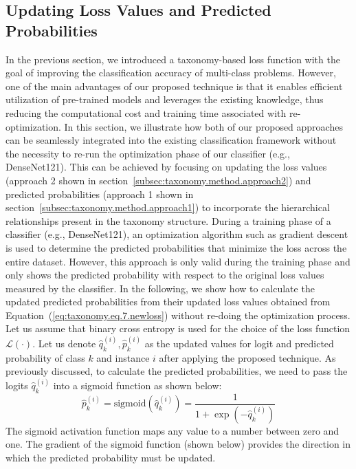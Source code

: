 \subsection{Updating Loss Values and Predicted Probabilities}\label{subsec:updating-loss-values-and-predicted-probabilities}
In the previous section, we introduced a taxonomy-based loss function with the goal of improving the classification accuracy of multi-class problems. However, one of the main advantages of our proposed technique is that it enables efficient utilization of pre-trained models and leverages the existing knowledge, thus reducing the computational cost and training time associated with re-optimization. In this section, we illustrate how both of our proposed approaches can be seamlessly integrated into the existing classification framework without the necessity to re-run the optimization phase of our classifier (e.g., DenseNet121). This can be achieved by focusing on updating the loss values (approach 2 shown in section~\ref{subsec:taxonomy.method.approach2}) and predicted probabilities (approach 1 shown in section~\ref{subsec:taxonomy.method.approach1}) to incorporate the hierarchical relationships present in the taxonomy structure.
During a training phase of a classifier (e.g., DenseNet121), an optimization algorithm such as gradient descent is used to determine the predicted probabilities that minimize the loss across the entire dataset. However, this approach is only valid during the training phase and only shows the predicted probability with respect to the original loss values measured by the classifier.
In the following, we show how to calculate the updated predicted probabilities from their updated loss values obtained from Equation~(\ref{eq:taxonomy.eq.7.newloss}) without re-doing the optimization process. Let us assume that binary cross entropy is used for the choice of the loss function $\mathcal{L}(\cdot) $. Let us denote $\widehat{q}_k^{(i)} , \widehat{p}_k^{(i)} $ as the updated values for logit and predicted probability of class $k $ and instance $i $ after applying the proposed technique. As previously discussed, to calculate the predicted probabilities, we need to pass the logits ${\widehat q}_k^{(i)} $ into a sigmoid function as shown below:
\begin{equation}
    \label{eq:taxonomy.eq.9.sigmoid}
    \widehat{p}_k^{(i)}=\text{sigmoid}\left(\widehat{q}_k^{(i)}\right)=\frac1{1+\exp\left(-\widehat{q}_k^{(i)}\right)}
\end{equation}
The sigmoid activation function maps any value to a number between zero and one. The gradient of the sigmoid function (shown below) provides the direction in which the predicted probability must be updated.
